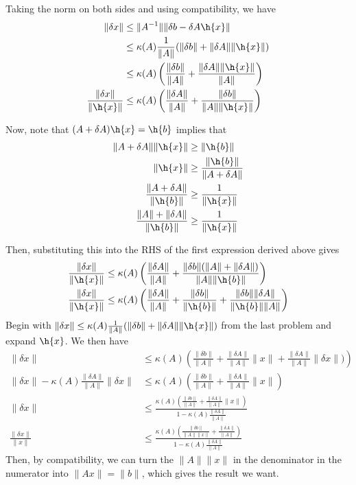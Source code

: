 \documentclass{article}
\begin{document}
Taking the norm on both sides and using compatibility, we have
\begin{align*}
    \|\delta x\|&\leq\|A^{-1}\|\|\delta b-\delta A\h{x}\|\\
    &\leq\kappa(A)\frac{1}{\|A\|}(\|\delta b\|+\|\delta A\|\|\h{x}\|)\\
    &\leq\kappa(A)\left(\frac{\|\delta b\|}{\|A\|} + \frac{\|\delta A\|\|\h{x}\|}{\|A\|}\right)\\
    \frac{\|\delta x\|}{\|\h{x}\|}&\leq\kappa(A)\left(\frac{\|\delta A\|}{\|A\|}+\frac{\|\delta b\|}{\|A\|\|\h{x}\|}\right)\\
\end{align*}

Now, note that $(A+\delta A)\h{x}=\h{b}$ implies that
\begin{align*}
    \|A+\delta A\|\|\h{x}\|&\geq\|\h{b}\|\\
    \|\h{x}\|&\geq\frac{\|\h{b}\|}{\|A+\delta A\|}\\
    \frac{\|A+\delta A\|}{\|\h{b}\|}&\geq\frac{1}{\|\h{x}\|}\\
    \frac{\|A\|+\|\delta A\|}{\|\h{b}\|}&\geq\frac{1}{\|\h{x}\|}
\end{align*}

Then, substituting this into the RHS of the first expression derived above gives
\begin{align*}
    \frac{\|\delta x\|}{\|\h{x}\|}&\leq\kappa(A)\left(\frac{\|\delta A\|}{\|A\|}+\frac{\|\delta b\|(\|A\|+\|\delta A\|)}{\|A\|\|\h{b}\|}\right)\\
    \frac{\|\delta x\|}{\|\h{x}\|}&\leq\kappa(A)\left(\frac{\|\delta A\|}{\|A\|}+\frac{\|\delta b\|}{\|\h{b}\|}+\frac{\|\delta b\|\|\delta A\|}{\|\h{b}\|\|A\|}\right)\\
\end{align*}
Begin with $\|\delta x\|\leq\kappa(A)\frac{1}{\|A\|}(\|\delta b\|+\|\delta A\|\|\h{x}\|)$ from the last problem and expand $\h{x}$. We then have
\begin{align*}
    \|\delta x\|&\leq\kappa(A)\left(\frac{\|\delta b\|}{\|A\|}+\frac{\|\delta A\|}{\|A\|}\|x\|+\frac{\|\delta A\|}{\|A\|}\|\delta x\|)\right)\\
    \|\delta x\|-\kappa(A)\frac{\|\delta A\|}{\|A\|}\|\delta x\|&\leq\kappa(A)\left(\frac{\|\delta b\|}{\|A\|}+\frac{\|\delta A\|}{\|A\|}\|x\|\right)\\
    \|\delta x\|&\leq\frac{\kappa(A)\left(\frac{\|\delta b\|}{\|A\|}+\frac{\|\delta A\|}{\|A\|}\|x\|\right)}{1-\kappa(A)\frac{\|\delta A\|}{\|A\|}}\\
    \frac{\|\delta x\|}{\|x\|}&\leq\frac{\kappa(A)\left(\frac{\|\delta b\|}{\|A\|\|x\|}+\frac{\|\delta A\|}{\|A\|}\right)}{1-\kappa(A)\frac{\|\delta A\|}{\|A\|}}
\end{align*}
Then, by compatibility, we can turn the $\|A\|\|x\|$ in the denominator in the numerator into $\|Ax\|=\|b\|$, which gives the result we want.
\end{document}
